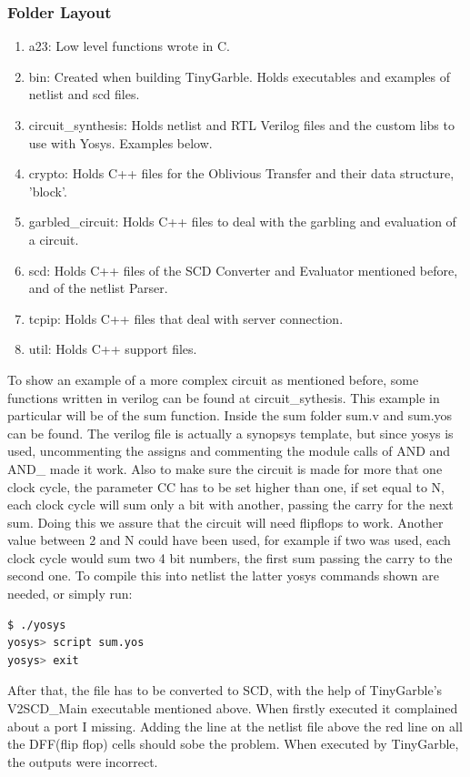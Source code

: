 \begin{refsection}
\subsubsection{Folder Layout}

\begin{enumerate}
\item a23: Low level functions wrote in C.
\item bin: Created when building TinyGarble. Holds executables and examples of netlist and scd files.
\item circuit\_synthesis: Holds netlist and RTL Verilog files and the custom libs to use with Yosys. Examples below.
\item crypto: Holds C++ files for the Oblivious Transfer and their data structure, 'block'.
\item garbled\_circuit: Holds C++ files to deal with the garbling and evaluation of a circuit.
\item scd:  Holds C++ files of the SCD Converter and Evaluator mentioned before, and of the netlist Parser.
\item tcpip: Holds C++ files that deal with server connection.
\item util: Holds C++ support files.
\end{enumerate}

To show an example of a more complex circuit as mentioned before, some functions written in verilog can be found at circuit\_sythesis. This example in particular will be of the sum function.
Inside the sum folder sum.v and sum.yos can be found. The verilog file is actually a synopsys template, but since yosys is used, uncommenting the assigns and commenting the module calls of AND and AND\_ made it work.
Also to make sure the circuit is made for more that one clock cycle, the parameter CC has to be set higher than one, if set equal to N, each clock cycle will sum only a bit with another, passing the carry for the next sum. Doing this we assure that the circuit will need flipflops to work. Another value between 2 and N could have  been used, for example if two was used, each clock cycle would sum two 4 bit numbers, the first sum passing the carry to the second one.
To compile this into netlist the latter yosys commands shown are needed, or simply run:
\begin{lstlisting}[caption={Yosys instructions to compile the sum.v file}, language=bash, captionpos=b]
$ ./yosys
yosys> script sum.yos
yosys> exit
\end{lstlisting}
After that, the file has to be converted to SCD, with the help of TinyGarble's V2SCD\_Main executable mentioned above. When firstly executed it complained about a port I missing. Adding the line at the netlist file above the red line on all the DFF(flip flop) cells should sobe the problem.  When executed by TinyGarble, the outputs were incorrect.


\end{refsection}
